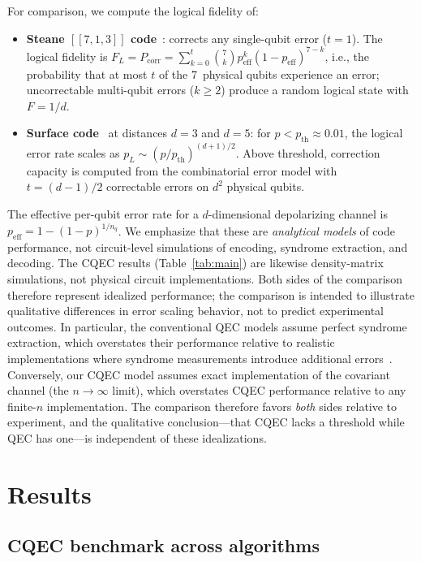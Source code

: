 \documentclass[prx,twocolumn,superscriptaddress,longbibliography,floatfix]{revtex4-2}
\begin{document}
For comparison, we compute the logical fidelity of:
\begin{itemize}
\item \textbf{Steane $[\![7,1,3]\!]$ code}~\cite{Steane1996}: corrects any single-qubit error ($t = 1$).
The logical fidelity is $F_L = P_\mathrm{corr} = \sum_{k=0}^{t} \binom{7}{k} p_\mathrm{eff}^k (1-p_\mathrm{eff})^{7-k}$, i.e., the probability that at most $t$ of the 7~physical qubits experience an error; uncorrectable multi-qubit errors ($k \geq 2$) produce a random logical state with $F = 1/d$.
\item \textbf{Surface code}~\cite{Kitaev2003,Fowler2012} at distances $d = 3$ and $d = 5$: for $p < p_\mathrm{th} \approx 0.01$, the logical error rate scales as $p_L \sim (p/p_\mathrm{th})^{(d+1)/2}$.
Above threshold, correction capacity is computed from the combinatorial error model with $t = (d-1)/2$ correctable errors on $d^2$ physical qubits.
\end{itemize}
The effective per-qubit error rate for a $d$-dimensional depolarizing channel is $p_\mathrm{eff} = 1 - (1-p)^{1/n_q}$.
We emphasize that these are \emph{analytical models} of code performance, not circuit-level simulations of encoding, syndrome extraction, and decoding.
The CQEC results (Table~\ref{tab:main}) are likewise density-matrix simulations, not physical circuit implementations.
Both sides of the comparison therefore represent idealized performance; the comparison is intended to illustrate qualitative differences in error scaling behavior, not to predict experimental outcomes.
In particular, the conventional QEC models assume perfect syndrome extraction, which overstates their performance relative to realistic implementations where syndrome measurements introduce additional errors~\cite{Fowler2012}.
Conversely, our CQEC model assumes exact implementation of the covariant channel (the $n \to \infty$ limit), which overstates CQEC performance relative to any finite-$n$ implementation.
The comparison therefore favors \emph{both} sides relative to experiment, and the qualitative conclusion---that CQEC lacks a threshold while QEC has one---is independent of these idealizations.


\section{Results}
\label{sec:results}

\subsection{CQEC benchmark across algorithms}
\label{sec:main_results}
\end{document}
